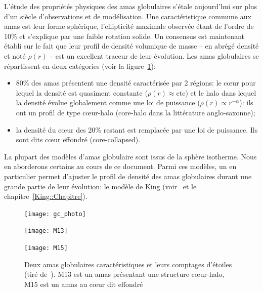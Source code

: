 			L'étude des propriétés physiques des amas globulaires s'étale aujourd'hui sur plus d'un siècle d'observations et de
			modélisation. Une caractéristique commune aux amas est leur forme sphérique, l'ellipticité maximale observée étant de l'ordre
			de 10\% et s'explique par une faible rotation solide. Un consensus est maintenant établi sur le fait que leur profil de
			densité volumique de masse -- en abrégé densité et noté $\rho(r)$ -- est un excellent traceur de leur évolution. Les amas
			globulaires se répartissent en deux catégories (voir la figure~\ref{Fig::Intro::images}):
			\begin{itemize}

				\item 80\% des amas présentent une densité caractérisée par 2 régions: le cœur pour lequel la densité est quasiment
					constante ($\rho(r) \approx \mathrm{cte}$) et le halo dans lequel la densité évolue globalement comme une loi
					de puissance ($\rho(r) \propto r^{-\alpha}$): ils ont un profil de type cœur-halo (core-halo dans la
					littérature anglo-saxonne);

				\item la densité du cœur des 20\% restant est remplacée par une loi de puissance. Ils sont dits cœur effondré
					(core-collapsed).

			\end{itemize}

			La plupart des modèles d'amas globulaire sont issus de la sphère isotherme. Nous en
			aborderons certains au cours de ce document. Parmi ces modèles, un en particulier
			permet d'ajuster le profil de densité des amas globulaires durant une grande
			partie de leur évolution: le modèle de King
			(voir~\cite{1966AJ.....71...64K} et le chapitre~\ref{King::Chapitre}).

			\begin{figure}[h]
				\begin{center}
					\texttt{[image: gc\_photo]}
				\end{center}
				\begin{minipage}{0.45\textwidth}
					\begin{center}
						\texttt{[image: M13]}
					\end{center}
				\end{minipage}\hfill
				\begin{minipage}{0.45\textwidth}
					\begin{center}
						\texttt{[image: M15]}
					\end{center}
				\end{minipage}
				\caption{\label{Fig::Intro::images}Deux amas globulaires
					caractéristiques et leurs comptages d'étoiles (tiré de~\cite{2010A&A...522A..71J}).
					M13 est un amas présentant une structure cœur-halo,
					M15 est un amas au cœur dit effondré}
			\end{figure}

